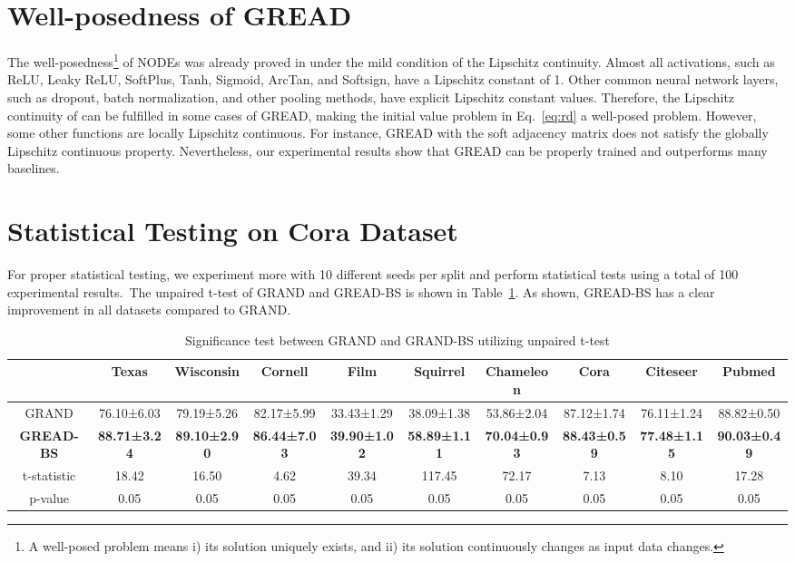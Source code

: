 \documentclass{article}
\theoremstyle{plain}
\theoremstyle{definition}
\theoremstyle{remark}
\newcommand{\std}{\scriptsize{}}
\begin{document}
\section{Well-posedness of GREAD}
The well-posedness\footnote{A well-posed problem means i) its solution uniquely exists, and ii) its solution continuously changes as input data changes.} of NODEs was already proved in \citet[Theorem 1.3]{lyons2004differential} under the mild condition of the Lipschitz continuity. Almost all activations, such as ReLU, Leaky ReLU, SoftPlus, Tanh, Sigmoid, ArcTan, and Softsign, have a Lipschitz constant of 1. Other common neural network layers, such as dropout, batch normalization, and other pooling methods, have explicit Lipschitz constant values. Therefore, the Lipschitz continuity of  can be fulfilled in some cases of GREAD, making the initial value problem in Eq.~\eqref{eq:rd} a well-posed problem. However, some other functions are locally Lipschitz continuous. For instance, GREAD with the soft adjacency matrix does not satisfy the globally Lipschitz continuous property. Nevertheless, our experimental results show that GREAD can be properly trained and outperforms many baselines.


\clearpage

\section{Statistical Testing on Cora Dataset}
For proper statistical testing, we experiment more with 10 different seeds per split and perform statistical tests using a total of 100 experimental results. The unpaired t-test of GRAND and GREAD-BS is shown in Table~\ref{tab:ttest}. As shown, GREAD-BS has a clear improvement in all datasets compared to GRAND.

\begin{table}[!ht]
    \centering
    \setlength{\tabcolsep}{2pt}
    \caption{Significance test between GRAND and GRAND-BS utilizing unpaired t-test}
    \begin{tabular}{cccccccccc}
    \toprule
        ~ & Texas & Wisconsin & Cornell & Film & Squirrel & Chameleon & Cora & Citeseer & Pubmed \\ \midrule
        GRAND & 76.10\std{±6.03} & 79.19\std{±5.26} & 82.17\std{±5.99} & 33.43\std{±1.29} & 38.09\std{±1.38} & 53.86\std{±2.04} & 87.12\std{±1.74} & 76.11\std{±1.24} & 88.82\std{±0.50} \\ 
        \textbf{GREAD-BS} & \textbf{88.71\std{±3.24}} & \textbf{89.10\std{±2.90}} & \textbf{86.44\std{±7.03}} & \textbf{39.90\std{±1.02}} & \textbf{58.89\std{±1.11}} & \textbf{70.04\std{±0.93}} & \textbf{88.43\std{±0.59}} & \textbf{77.48\std{±1.15}} & \textbf{90.03\std{±0.49}} \\ \midrule
        t-statistic & 18.42 & 16.50 & 4.62 & 39.34 & 117.45 & 72.17 & 7.13 & 8.10 & 17.28 \\ 
        p-value & 0.05 & 0.05 & 0.05 & 0.05 & 0.05 & 0.05 & 0.05 & 0.05 & 0.05 \\ \bottomrule
    \end{tabular}
    \label{tab:ttest}
\end{table}
\end{document}
